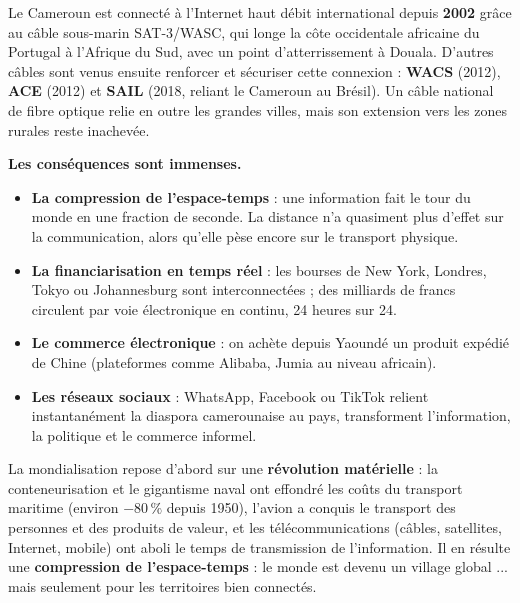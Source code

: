 \documentclass[11pt]{article}
\newcommand{\cle}[1]{{\popxbold\color{popdark}#1}}
\begin{document}
\begin{savaistu}
Le Cameroun est connecté à l'Internet haut débit international depuis \textbf{2002} grâce au câble sous-marin \cle{SAT-3/WASC}, qui longe la côte occidentale africaine du Portugal à l'Afrique du Sud, avec un point d'atterrissement à Douala. D'autres câbles sont venus ensuite renforcer et sécuriser cette connexion : \textbf{WACS} (2012), \textbf{ACE} (2012) et \textbf{SAIL} (2018, reliant le Cameroun au Brésil). Un câble national de fibre optique relie en outre les grandes villes, mais son extension vers les zones rurales reste inachevée.
\end{savaistu}

\textbf{Les conséquences sont immenses.}

\begin{itemize}
\item \textbf{La compression de l'espace-temps} : une information fait le tour du monde en une fraction de seconde. La distance n'a quasiment plus d'effet sur la communication, alors qu'elle pèse encore sur le transport physique.
\item \textbf{La financiarisation en temps réel} : les bourses de New York, Londres, Tokyo ou Johannesburg sont interconnectées ; des milliards de francs circulent par voie électronique en continu, 24 heures sur 24.
\item \textbf{Le commerce électronique} : on achète depuis Yaoundé un produit expédié de Chine (plateformes comme Alibaba, Jumia au niveau africain).
\item \textbf{Les réseaux sociaux} : WhatsApp, Facebook ou TikTok relient instantanément la diaspora camerounaise au pays, transforment l'information, la politique et le commerce informel.
\end{itemize}

\begin{aretenir}
La mondialisation repose d'abord sur une \textbf{révolution matérielle} : la conteneurisation et le gigantisme naval ont effondré les coûts du transport maritime (environ $-80\,\%$ depuis 1950), l'avion a conquis le transport des personnes et des produits de valeur, et les télécommunications (câbles, satellites, Internet, mobile) ont aboli le temps de transmission de l'information. Il en résulte une \textbf{compression de l'espace-temps} : le monde est devenu un \og village global \fg{}... mais seulement pour les territoires bien connectés.
\end{aretenir}
\end{document}

